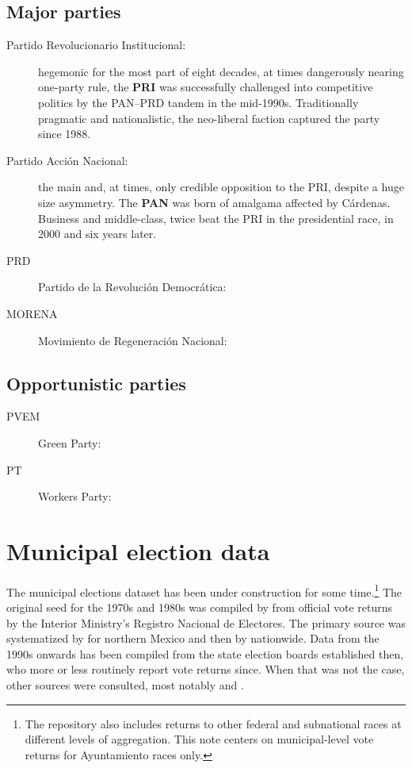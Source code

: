 \documentclass[letter,12pt]{article}
\begin{document}
\subsection{Major parties}

\begin{description}
\item[Partido Revolucionario Institucional:] hegemonic for the most part of eight decades, at times dangerously nearing one-party rule, the \textbf{PRI} was successfully challenged into competitive politics by the PAN--PRD tandem in the mid-1990s. Traditionally pragmatic and nationalistic, the neo-liberal faction captured the party since 1988. 
\item[Partido Acción Nacional:] the main and, at times, only credible opposition to the PRI, despite a huge size asymmetry. The \textbf{PAN} was born of amalgama affected by Cárdenas. Business and middle-class, twice beat the PRI in the presidential race, in 2000 and six years later. 
\item[PRD] Partido de la Revolución Democrática: 
\item[MORENA] Movimiento de Regeneración Nacional:  
\end{description}

\subsection{Opportunistic parties}

\begin{description}
\item[PVEM] Green Party: 
\item[PT] Workers Party: 
\end{description}

\section{Municipal election data}
The municipal elections dataset has been under construction for some time.\footnote{The repository also includes returns to other federal and subnational races at different levels of aggregation. This note centers on municipal-level vote returns for Ayuntamiento races only.} The original seed for the 1970s and 1980s was compiled by \citet{molinar.1991a} from official vote returns by the Interior Ministry's Registro Nacional de Electores. The primary source was systematized by \citet{magar.1994} for northern Mexico and then by \citet{varela.2004} nationwide. Data from the 1990s onwards has been compiled from the state election boards established then, who more or less routinely report vote returns since. When that was not the case, other sources were consulted, most notably \citet{revista.voz.y.voto} and \citet{cede.uam.izt}.
\end{document}
